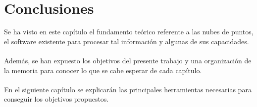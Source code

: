 \section{Conclusiones}
Se ha visto en este capítulo el fundamento teórico referente a las nubes de puntos, el software existente para procesar tal información y algunas de sus capacidades.
\\
\\
Además, se han expuesto los objetivos del presente trabajo y una organización de la memoria para conocer lo que se cabe esperar de cada capítulo.
\\
\\
En el siguiente capítulo se explicarán las principales herramientas necesarias para conseguir los objetivos propuestos.






